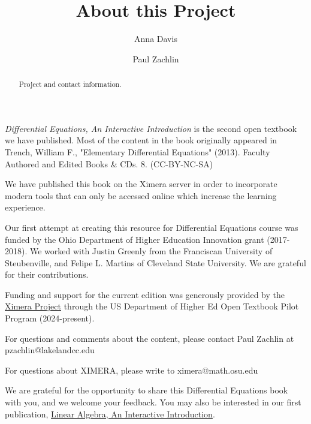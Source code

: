 \documentclass{ximera}
\author{Anna Davis \and Paul Zachlin}
\title{About this Project} \license{CC-BY 4.0}
\begin{document}
\begin{abstract}
 Project and contact information.
\end{abstract}
\maketitle

\emph{Differential Equations, An Interactive Introduction} is the second open textbook we have published.  Most of the content in the book originally appeared in Trench, William F., "Elementary Differential Equations" (2013). Faculty Authored and Edited Books \& CDs. 8. (CC-BY-NC-SA)

We have published this book on the Ximera server in order to incorporate modern tools that can only be accessed online which increase the learning experience.

Our first attempt at creating this resource for Differential Equations course was funded by the Ohio Department of Higher Education Innovation grant (2017-2018).  We worked with Justin Greenly from the Franciscan University of Steubenville, and Felipe L. Martins of Cleveland State University.  We are grateful for their contributions.

Funding and support for the current edition was generously provided by the \href{https://github.com/XimeraProject}{Ximera Project} through the US Department of Higher Ed Open Textbook Pilot Program (2024-present).

For questions and comments about the content, please contact Paul Zachlin at pzachlin@lakelandcc.edu

For questions about XIMERA, please write to ximera@math.osu.edu

We are grateful for the opportunity to share this Differential Equations book with you, and we welcome your feedback.  You may also be interested in our first publication, \href{https://sites.google.com/view/lin-alg-interactive-intro/}{Linear Algebra, An Interactive Introduction}.
\end{document}
